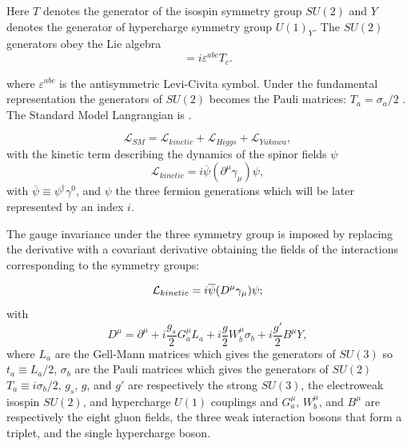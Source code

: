 Here $T$ denotes the generator of the isospin symmetry group $SU(2)$ and $Y$ denotes the generator of hypercharge symmetry group $U(1)_Y$. The $SU(2)$ generators obey the Lie algebra
\begin{equation}
[T^a, T^b] = i\varepsilon^{abc}T_c.
\label{eqn:su2liealgebr}
\end{equation}

where $\varepsilon^{abc}$ is the antisymmetric Levi-Civita symbol. Under the fundamental representation the generators of $SU(2)$  becomes the Pauli matrices: $T_a = \sigma_a/2$ \cite{roubillard2005th}. The Standard Model Langrangian is \cite{noteskooijman11}.

\begin{equation}
\mathcal L_{SM} = \mathcal L_{kinetic} + \mathcal L_{Higgs} + \mathcal L_{Yukawa},
\label{eqn:SMLagrangian}
\end{equation}
with the kinetic term describing the dynamics of the spinor fields $\psi$
\begin{equation}
\mathcal L_{kinetic} = i\overline{\psi}(\partial^\mu\gamma_\mu)\psi,
\label{eqn:SMLkinetic}
\end{equation}
with $\overline{\psi} \equiv \psi^\dag\gamma^0$, and $\psi$ the three fermion generations which will be later represented by an index $i$. 

The gauge invariance under the three symmetry group is imposed by replacing the derivative with a covariant derivative obtaining the fields of the interactions corresponding to the symmetry groups:

\begin{equation}
\mathcal L_{kinetic} =  i\overline{\psi}(D^\mu\gamma_\mu)\psi \\;
\label{eqn:newSMLkinetic}
\end{equation}
with
\begin{equation}
D^\mu = \partial^\mu + i\frac{g_s}{2}G^\mu_aL_a + i\frac{g}{2}W^\mu_b\sigma_b+i\frac{g'}{2}B^\mu Y,
\label{eqn:SMcovariant}
\end{equation}
where $L_a$ are the Gell-Mann matrices which gives the generators of $SU(3)$ so $t_a \equiv L_a/2$, $\sigma_b$ are the Pauli matrices which gives the generators of $SU(2)$ $T_a \equiv i\sigma_b/2$, $g_s$, $g$, and $g'$ are respectively the strong $SU(3)$, the electroweak isospin $SU(2)$, and hypercharge $U(1)$ couplings and $G^\mu_a$, $W^\mu_b$, and $B^\mu$ are respectively the eight gluon fields, the three weak interaction bosons that form a triplet, and the single hypercharge boson.

